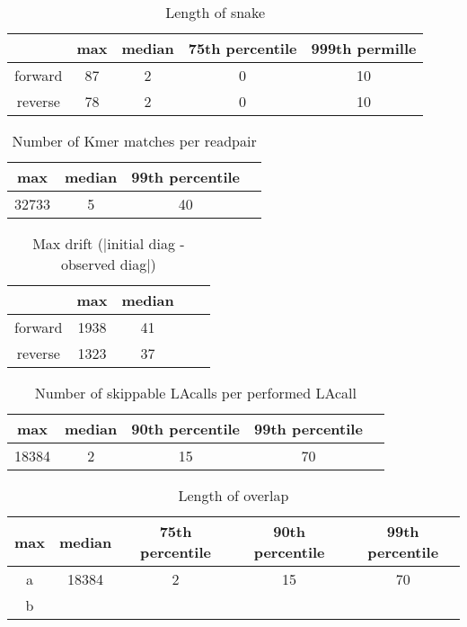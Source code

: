 \documentclass[../main/thesis.tex]{subfiles}
\begin{document}
\begin{table}[h]
\caption{Length of snake}
\centering
\vspace{-5pt}
\begin{tabular}{c|c c c c}
& max & median & 75th percentile & 999th permille \\ \hline
forward & 87 & 2 & 0 & 10 \\
reverse & 78 & 2 & 0 & 10 \\
\end{tabular}
\end{table}

\begin{table}[h]
\caption{Number of Kmer matches per readpair}
\centering
\vspace{-5pt}
\begin{tabular}{c|c c c}
max & median & 99th percentile \\ \hline
32733 & 5 & 40 \\
\end{tabular}
\end{table}

\begin{table}[h]
\caption{Max drift (|initial diag - observed diag|)}
\centering
\vspace{-5pt}
\begin{tabular}{c|c c c c}
& max & median \\ \hline
forward & 1938 & 41 \\
reverse & 1323 & 37 \\
\end{tabular}
\end{table}

\begin{table}[h]
\caption{Number of skippable LAcalls per performed LAcall}
\centering
\vspace{-5pt}
\begin{tabular}{c|c c c c}
max & median & 90th percentile & 99th percentile \\ \hline
18384 & 2 & 15 & 70 \\
\end{tabular}
\end{table}

\begin{table}[h]
\caption{Length of overlap}
\centering
\vspace{-5pt}
\begin{tabular}{c|c c c c}
max & median & 75th percentile & 90th percentile & 99th percentile \\ \hline
a & 18384 & 2 & 15 & 70 \\
b & & & &  \\
\end{tabular}
\end{table}
\end{document}

